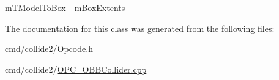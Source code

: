 \begin{DoxyItemize}
\item m\+T\+Model\+To\+Box -\/ m\+Box\+Extents 
\end{DoxyItemize}

The documentation for this class was generated from the following files\+:\begin{DoxyCompactItemize}
\item 
cmd/collide2/\hyperlink{Opcode_8h}{Opcode.\+h}\item 
cmd/collide2/\hyperlink{OPC__OBBCollider_8cpp}{O\+P\+C\+\_\+\+O\+B\+B\+Collider.\+cpp}\end{DoxyCompactItemize}
